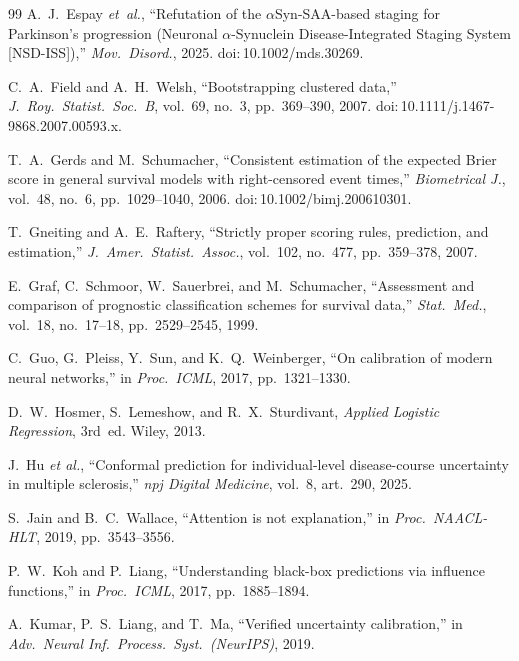 \documentclass[11pt]{article}
\begin{document}
\begin{thebibliography}{99}
A.~J.~Espay \textit{et~al.}, ``Refutation of the $\alpha$Syn-SAA-based staging for Parkinson's progression (Neuronal $\alpha$-Synuclein Disease-Integrated Staging System [NSD-ISS]),'' \textit{Mov.\ Disord.}, 2025. doi:\,10.1002/mds.30269.

C.~A.~Field and A.~H.~Welsh, ``Bootstrapping clustered data,'' \textit{J.\ Roy.\ Statist.\ Soc.\ B}, vol.~69, no.~3, pp.~369--390, 2007. doi:\,10.1111/j.1467-9868.2007.00593.x.

T.~A.~Gerds and M.~Schumacher, ``Consistent estimation of the expected Brier score in general survival models with right-censored event times,'' \textit{Biometrical J.}, vol.~48, no.~6, pp.~1029--1040, 2006. doi:\,10.1002/bimj.200610301.

T.~Gneiting and A.~E.~Raftery, ``Strictly proper scoring rules, prediction, and estimation,'' \textit{J.\ Amer.\ Statist.\ Assoc.}, vol.~102, no.~477, pp.~359--378, 2007.

E.~Graf, C.~Schmoor, W.~Sauerbrei, and M.~Schumacher, ``Assessment and comparison of prognostic classification schemes for survival data,'' \textit{Stat.\ Med.}, vol.~18, no.~17--18, pp.~2529--2545, 1999.

C.~Guo, G.~Pleiss, Y.~Sun, and K.~Q.~Weinberger, ``On calibration of modern neural networks,'' in \textit{Proc.\ ICML}, 2017, pp.~1321--1330.

D.~W.~Hosmer, S.~Lemeshow, and R.~X.~Sturdivant, \textit{Applied Logistic Regression}, 3rd~ed. Wiley, 2013.

J.~Hu \textit{et al.}, ``Conformal prediction for individual-level disease-course uncertainty in multiple sclerosis,'' \textit{npj Digital Medicine}, vol.~8, art.~290, 2025.

S.~Jain and B.~C.~Wallace, ``Attention is not explanation,'' in \textit{Proc.\ NAACL-HLT}, 2019, pp.~3543--3556.

P.~W.~Koh and P.~Liang, ``Understanding black-box predictions via influence functions,'' in \textit{Proc.\ ICML}, 2017, pp.~1885--1894.

A.~Kumar, P.~S.~Liang, and T.~Ma, ``Verified uncertainty calibration,'' in \textit{Adv.\ Neural Inf.\ Process.\ Syst.\ (NeurIPS)}, 2019.


\end{thebibliography}
\end{document}
